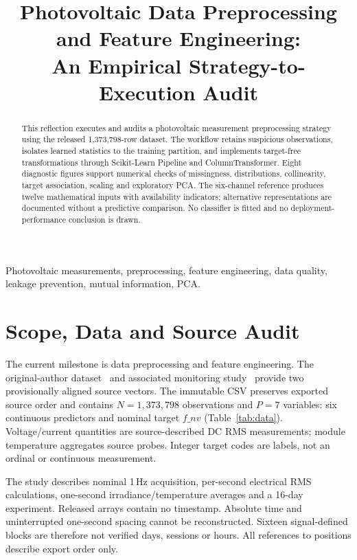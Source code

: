 \documentclass[conference]{IEEEtran}
\title{Photovoltaic Data Preprocessing and Feature Engineering:\\An Empirical Strategy-to-Execution Audit}
\author{\IEEEauthorblockN{Ruganji Prince}
\IEEEauthorblockA{Carnegie Mellon University Africa\\04-652 Artificial Intelligence System Design\\Assignment 3: Data Preprocessing Phase 2}}
\begin{document}
\maketitle
\begin{abstract}
This reflection executes and audits a photovoltaic measurement preprocessing strategy using the released 1,373,798-row dataset. The workflow retains suspicious observations, isolates learned statistics to the training partition, and implements target-free transformations through Scikit-Learn Pipeline and ColumnTransformer. Eight diagnostic figures support numerical checks of missingness, distributions, collinearity, target association, scaling and exploratory PCA. The six-channel reference produces twelve mathematical inputs with availability indicators; alternative representations are documented without a predictive comparison. No classifier is fitted and no deployment-performance conclusion is drawn.
\end{abstract}
\begin{IEEEkeywords}
Photovoltaic measurements, preprocessing, feature engineering, data quality, leakage prevention, mutual information, PCA.
\end{IEEEkeywords}

\section{Scope, Data and Source Audit}
The current milestone is data preprocessing and feature engineering. The original-author dataset~\cite{dataset} and associated monitoring study~\cite{study} provide two provisionally aligned source vectors. The immutable CSV preserves exported source order and contains $N=1{,}373{,}798$ observations and $P=7$ variables: six continuous predictors and nominal target $f\_nv$ (Table~\ref{tab:data}). Voltage/current quantities are source-described DC RMS measurements; module temperature aggregates source probes. Integer target codes are labels, not an ordinal or continuous measurement.

The study describes nominal 1\,Hz acquisition, per-second electrical RMS calculations, one-second irradiance/temperature averages and a 16-day experiment. Released arrays contain no timestamp. Absolute time and uninterrupted one-second spacing cannot be reconstructed. Sixteen signal-defined blocks are therefore not verified days, sessions or hours. All references to positions describe export order only.
\end{document}
